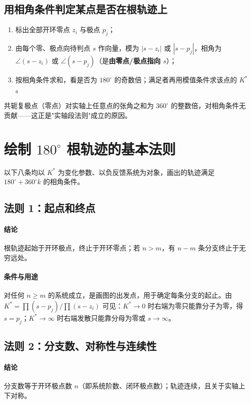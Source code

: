 \subsection{用相角条件判定某点是否在根轨迹上}
\begin{enumerate}
    \item 标出全部开环零点 $z_i$ 与极点 $p_j$；
    \item 由每个零、极点向待判点 $s$ 作向量，模为 $|s-z_i|$ 或 $|s-p_j|$，相角为 $\angle(s-z_i)$ 或 $\angle(s-p_j)$（是\textbf{由零点/极点指向 $s$}）；
    \item 按相角条件求和，看是否为 $180^\circ$ 的奇数倍；满足者再用模值条件求该点的 $K^*$。
\end{enumerate}
共轭复极点（零点）对实轴上任意点的张角之和为 $360^\circ$ 的整数倍，对相角条件无贡献——这正是"实轴段法则"成立的原因。

\medskip

\section{绘制 $180^\circ$ 根轨迹的基本法则}
以下八条均以 $K^*$ 为变化参数、以负反馈系统为对象，画出的轨迹满足 $180^\circ+360^\circ k$ 的相角条件。

\subsection{法则 1：起点和终点}
\paragraph{结论}根轨迹起始于开环极点，终止于开环零点；若 $n>m$，有 $n-m$ 条分支终止于无穷远处。

\paragraph{条件与用途}对任何 $n\ge m$ 的系统成立，是画图的出发点，用于确定每条分支的起止。由 $K^*=\prod(s-p_j)/\prod(s-z_i)$ 可见：$K^*\to0$ 时右端为零只能靠分子为零，得 $s=p_j$；$K^*\to\infty$ 时右端发散只能靠分母为零或 $s\to\infty$。

\subsection{法则 2：分支数、对称性与连续性}
\paragraph{结论}分支数等于开环极点数 $n$（即系统阶数、闭环极点数）；轨迹连续，且关于实轴上下对称。

